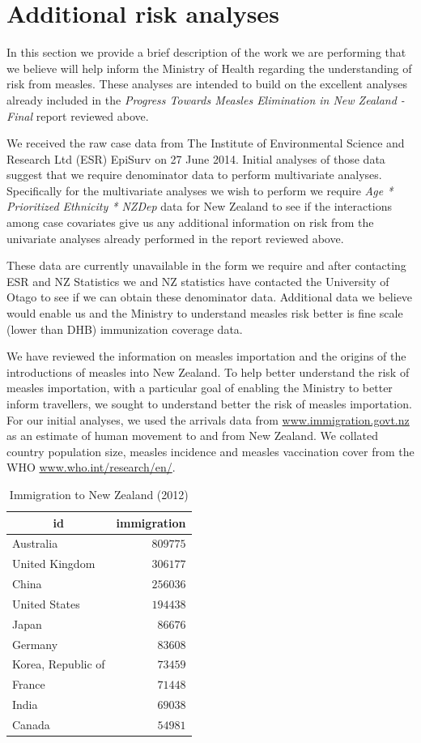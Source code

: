 \documentclass{article}
\begin{document}
\section{Additional risk analyses}

In this section we provide a brief description of the work we are performing that we believe will help inform the Ministry of Health regarding the understanding of risk from measles. These analyses are intended to build on the excellent analyses already included in the \emph {Progress Towards Measles Elimination in New Zealand - Final} report reviewed above.

We received the raw case data from The Institute of Environmental Science and Research Ltd (ESR) EpiSurv on 27 June 2014. Initial analyses of those data suggest that we require denominator data to perform multivariate analyses. Specifically for the multivariate analyses we wish to perform we require \emph{Age * Prioritized Ethnicity * NZDep} data for New Zealand to see if the interactions among case covariates give us any additional information on risk from the univariate analyses already performed in the report reviewed above.

These data are currently unavailable in the form we require and after contacting ESR and NZ Statistics we and NZ statistics have contacted the University of Otago to see if we can obtain these denominator data. Additional data we believe would enable us and the Ministry to understand measles risk better is fine scale (lower than DHB) immunization coverage data.

We have reviewed the information on measles importation and the origins of the introductions of measles into New Zealand. To help better understand the risk of measles importation, with a particular goal of enabling the Ministry to better inform travellers, we sought to understand better the risk of measles importation. For our initial analyses, we used the arrivals data from \href{http://www.immigration.govt.nz/}{www.immigration.govt.nz} as an estimate of human movement to and from New Zealand. We collated country population size, measles incidence and measles vaccination cover from the WHO \href{http://www.who.int/research/en/}{www.who.int/research/en/}.


\begin{table}
\caption{Immigration to New Zealand (2012)}
\begin{center}
\begin{tabular}{lr}
\hline\hline
\multicolumn{1}{c}{id}&\multicolumn{1}{c}{immigration}\tabularnewline
\hline
Australia&$809775$\tabularnewline
United Kingdom&$306177$\tabularnewline
China&$256036$\tabularnewline
United States&$194438$\tabularnewline
Japan&$ 86676$\tabularnewline
Germany&$ 83608$\tabularnewline
Korea, Republic of&$ 73459$\tabularnewline
France&$ 71448$\tabularnewline
India&$ 69038$\tabularnewline
Canada&$ 54981$\tabularnewline
\hline
\end{tabular}\end{center}\end{table}
\end{document}
